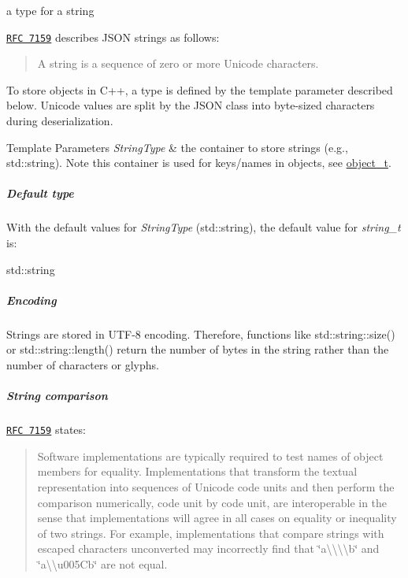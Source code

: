 a type for a string 

\href{http://rfc7159.net/rfc7159}{\tt R\+FC 7159} describes J\+S\+ON strings as follows\+: \begin{quote}
A string is a sequence of zero or more Unicode characters. \end{quote}


To store objects in C++, a type is defined by the template parameter described below. Unicode values are split by the J\+S\+ON class into byte-\/sized characters during deserialization.


\begin{DoxyTemplParams}{Template Parameters}
{\em String\+Type} & the container to store strings (e.\+g., {\ttfamily std\+::string}). Note this container is used for keys/names in objects, see \hyperlink{classnlohmann_1_1basic__json_a5e3df077f880583a96d74cd63e173cb2}{object\+\_\+t}.\\
\hline
\end{DoxyTemplParams}
\subparagraph*{Default type}

With the default values for {\itshape String\+Type} ({\ttfamily std\+::string}), the default value for {\itshape string\+\_\+t} is\+:


\begin{DoxyCode}
std::string
\end{DoxyCode}


\subparagraph*{Encoding}

Strings are stored in U\+T\+F-\/8 encoding. Therefore, functions like {\ttfamily std\+::string\+::size()} or {\ttfamily std\+::string\+::length()} return the number of bytes in the string rather than the number of characters or glyphs.

\subparagraph*{String comparison}

\href{http://rfc7159.net/rfc7159}{\tt R\+FC 7159} states\+: \begin{quote}
Software implementations are typically required to test names of object members for equality. Implementations that transform the textual representation into sequences of Unicode code units and then perform the comparison numerically, code unit by code unit, are interoperable in the sense that implementations will agree in all cases on equality or inequality of two strings. For example, implementations that compare strings with escaped characters unconverted may incorrectly find that {\ttfamily \char`\"{}a\textbackslash{}\textbackslash{}\textbackslash{}\textbackslash{}b\char`\"{}} and {\ttfamily \char`\"{}a\textbackslash{}\textbackslash{}u005\+Cb\char`\"{}} are not equal. \end{quote}


